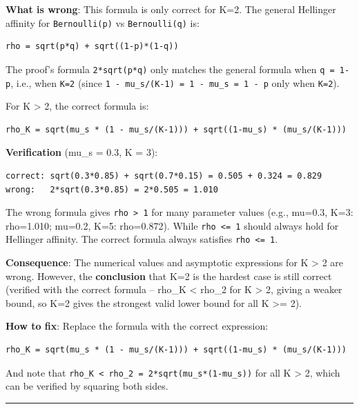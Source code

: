 \documentclass[
  12pt,
]{ctexart}
\begin{document}
\textbf{What is wrong}: This formula is only correct for K=2. The
general Hellinger affinity for \texttt{Bernoulli(p)} vs
\texttt{Bernoulli(q)} is:

\begin{verbatim}
rho = sqrt(p*q) + sqrt((1-p)*(1-q))
\end{verbatim}

The proof's formula \texttt{2*sqrt(p*q)} only matches the general
formula when \texttt{q\ =\ 1-p}, i.e., when \texttt{K=2} (since
\texttt{1\ -\ mu\_s/(K-1)\ =\ 1\ -\ mu\_s\ =\ 1\ -\ p} only when
\texttt{K=2}).

For K \textgreater{} 2, the correct formula is:

\begin{verbatim}
rho_K = sqrt(mu_s * (1 - mu_s/(K-1))) + sqrt((1-mu_s) * (mu_s/(K-1)))
\end{verbatim}

\textbf{Verification} (mu\_s = 0.3, K = 3):

\begin{verbatim}
correct: sqrt(0.3*0.85) + sqrt(0.7*0.15) = 0.505 + 0.324 = 0.829
wrong:   2*sqrt(0.3*0.85) = 2*0.505 = 1.010
\end{verbatim}

The wrong formula gives \texttt{rho\ \textgreater{}\ 1} for many
parameter values (e.g., mu=0.3, K=3: rho=1.010; mu=0.2, K=5: rho=0.872).
While \texttt{rho\ \textless{}=\ 1} should always hold for Hellinger
affinity. The correct formula always satisfies
\texttt{rho\ \textless{}=\ 1}.

\textbf{Consequence}: The numerical values and asymptotic expressions
for K \textgreater{} 2 are wrong. However, the \textbf{conclusion} that
K=2 is the hardest case is still correct (verified with the correct
formula -- rho\_K \textless{} rho\_2 for K \textgreater{} 2, giving a
weaker bound, so K=2 gives the strongest valid lower bound for all K
\textgreater= 2).

\textbf{How to fix}: Replace the formula with the correct expression:

\begin{verbatim}
rho_K = sqrt(mu_s * (1 - mu_s/(K-1))) + sqrt((1-mu_s) * (mu_s/(K-1)))
\end{verbatim}

And note that
\texttt{rho\_K\ \textless{}\ rho\_2\ =\ 2*sqrt(mu\_s*(1-mu\_s))} for all
K \textgreater{} 2, which can be verified by squaring both sides.

\begin{center}\rule{0.5\linewidth}{0.5pt}\end{center}
\end{document}
